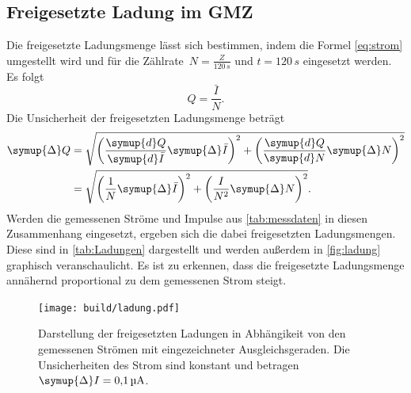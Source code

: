 \subsection{Freigesetzte Ladung im GMZ}
Die freigesetzte Ladungsmenge lässt sich bestimmen, indem die Formel \eqref{eq:strom} umgestellt wird und für die 
Zählrate~$N=\frac{Z}{120\,s}$ und $t=120\,s$ eingesetzt werden. Es folgt
\begin{equation*}
    Q = \frac{\bar{I}}{N}.
\end{equation*}
Die Unsicherheit der freigesetzten Ladungsmenge beträgt
\begin{align*}
    \symup{\Delta}Q &= \sqrt{\left(\frac{\symup{d}Q}{\symup{d}\bar{I}}\symup{\Delta} \bar{I} \right)^2
    + \left(\frac{\symup{d}Q}{\symup{d}N}\symup{\Delta} N \right)^2} \\
    &= \sqrt{\left(\frac{1}{N}\symup{\Delta} \bar{I}\right)^2 + \left(\frac{I}{N^2} \symup{\Delta} N\right)^2}.
\end{align*}
Werden die gemessenen Ströme und Impulse aus \autoref{tab:messdaten} in diesen Zusammenhang eingesetzt, ergeben sich die dabei freigesetzten Ladungsmengen.
Diese sind in \autoref{tab:Ladungen} dargestellt und werden außerdem in \autoref{fig:ladung} graphisch veranschaulicht. 
Es ist zu erkennen, dass die freigesetzte Ladungsmenge annähernd proportional zu dem gemessenen Strom steigt.
\begin{figure}[H]
    \centering
    \texttt{[image: build/ladung.pdf]}
    \caption{Darstellung der freigesetzten Ladungen in Abhängikeit von den gemessenen Strömen mit eingezeichneter 
    Ausgleichsgeraden. Die Unsicherheiten des Strom sind konstant und betragen $\symup{\Delta} I = \qty{0.1}{\micro\ampere}$.}
    \label{fig:ladung}
\end{figure}